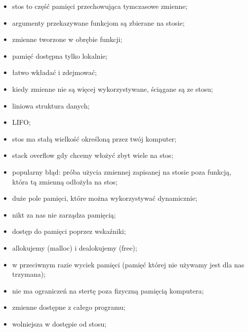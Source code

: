 \documentclass[notheorems, aspectratio=54]{beamer}
\begin{document}
\begin{frame}
	
	\begin{itemize}
		\item stos to część pamięci przechowująca tymczasowe zmienne;
		\item argumenty przekazywane funkcjom są zbierane na stosie;
		\item zmienne tworzone w obrębie funkcji;
		\item pamięć dostępna tylko lokalnie;
		\item łatwo wkładać i zdejmować;
		\item kiedy zmienne nie są więcej wykorzystywane, ściągane są ze stosu;
		\item liniowa struktura danych;
		\item LIFO;
		\item stos ma stałą wielkość określoną przez twój komputer;
		\item stack overflow gdy chcemy włożyć zbyt wiele na stos;
		\item popularny błąd: próba użycia zmiennej zapisanej na stosie poza
		      funkcją, która tą zmienną odłożyła na stos;
	\end{itemize}
	
\end{frame}

\begin{frame}
	
	\begin{itemize}
		\item duże pole pamięci, które można wykorzystywać dynamicznie;
		\item nikt za nas nie zarządza pamięcią;
		\item dostęp do pamięci poprzez wskaźniki;
		\item allokujemy (malloc) i dealokujemy (free);
		\item w przeciwnym razie wyciek pamięci (pamięć której nie używamy jest
		      dla nas trzymana);
		\item nie ma ograniczeń na stertę poza fizyczną pamięcią komputera;
		\item zmienne dostępne z całego programu;
		\item wolniejsza w dostępie od stosu;
	\end{itemize}
\end{frame}
\end{document}
